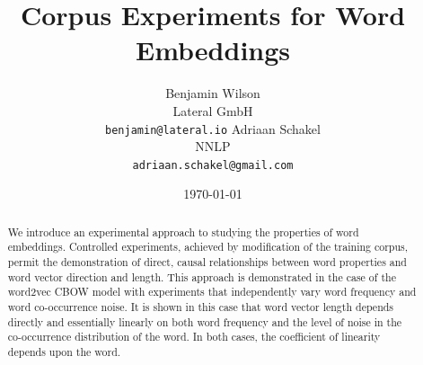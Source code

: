 \documentclass{article} %
\title{Corpus Experiments for Word Embeddings}
\author{
 	Benjamin Wilson\\
	Lateral GmbH\\
	\texttt{benjamin@lateral.io}
	\And
	Adriaan Schakel\\
	NNLP\\
	\texttt{adriaan.schakel@gmail.com}
 }
\date{\today}
\begin{document}
\graphicspath{{../outputs/}}
\maketitle


\begin{abstract}
	We introduce an experimental approach to studying the properties of word embeddings.
	Controlled experiments, achieved by modification of the training corpus, permit the demonstration of direct, causal relationships between word properties and word vector direction and length.
	This approach is demonstrated in the case of the word2vec CBOW model with experiments that independently vary word frequency and word co-occurrence noise.
	It is shown in this case that word vector length depends directly and essentially linearly on both word frequency and the level of noise in the co-occurrence distribution of the word.
	In both cases, the coefficient of linearity depends upon the word.
\end{abstract} 
\end{document}
